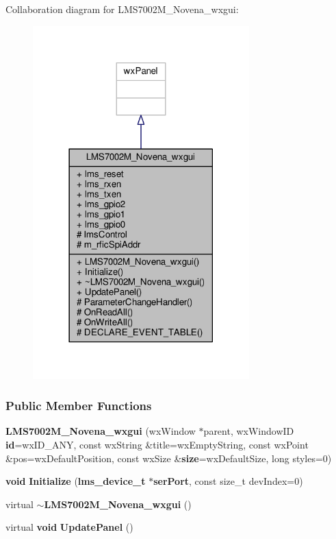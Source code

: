 Collaboration diagram for L\+M\+S7002\+M\+\_\+\+Novena\+\_\+wxgui\+:
\nopagebreak
\begin{figure}[H]
\begin{center}
\leavevmode
\includegraphics[width=237pt]{de/d47/classLMS7002M__Novena__wxgui__coll__graph}
\end{center}
\end{figure}
\subsubsection*{Public Member Functions}
\begin{DoxyCompactItemize}
\item 
{\bf L\+M\+S7002\+M\+\_\+\+Novena\+\_\+wxgui} (wx\+Window $\ast$parent, wx\+Window\+ID {\bf id}=wx\+I\+D\+\_\+\+A\+NY, const wx\+String \&title=wx\+Empty\+String, const wx\+Point \&pos=wx\+Default\+Position, const wx\+Size \&{\bf size}=wx\+Default\+Size, long styles=0)
\item 
{\bf void} {\bf Initialize} ({\bf lms\+\_\+device\+\_\+t} $\ast${\bf ser\+Port}, const size\+\_\+t dev\+Index=0)
\item 
virtual {\bf $\sim$\+L\+M\+S7002\+M\+\_\+\+Novena\+\_\+wxgui} ()
\item 
virtual {\bf void} {\bf Update\+Panel} ()
\end{DoxyCompactItemize}

